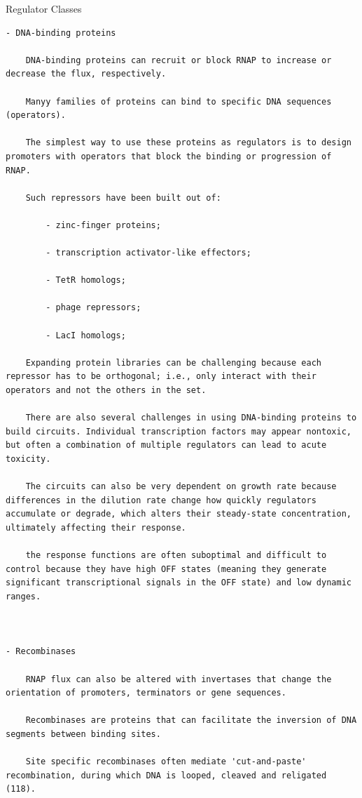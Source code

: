 \documentclass[
]{book}
\begin{document}
Regulator Classes

\begin{verbatim}
- DNA-binding proteins

    DNA-binding proteins can recruit or block RNAP to increase or decrease the flux, respectively.

    Manyy families of proteins can bind to specific DNA sequences (operators).

    The simplest way to use these proteins as regulators is to design promoters with operators that block the binding or progression of RNAP.

    Such repressors have been built out of:

        - zinc-finger proteins;

        - transcription activator-like effectors;

        - TetR homologs;

        - phage repressors;

        - LacI homologs;

    Expanding protein libraries can be challenging because each repressor has to be orthogonal; i.e., only interact with their operators and not the others in the set.

    There are also several challenges in using DNA-binding proteins to build circuits. Individual transcription factors may appear nontoxic, but often a combination of multiple regulators can lead to acute toxicity.

    The circuits can also be very dependent on growth rate because differences in the dilution rate change how quickly regulators accumulate or degrade, which alters their steady-state concentration, ultimately affecting their response.

    the response functions are often suboptimal and difficult to control because they have high OFF states (meaning they generate significant transcriptional signals in the OFF state) and low dynamic ranges.



- Recombinases

    RNAP flux can also be altered with invertases that change the orientation of promoters, terminators or gene sequences.

    Recombinases are proteins that can facilitate the inversion of DNA segments between binding sites.

    Site specific recombinases often mediate 'cut-and-paste' recombination, during which DNA is looped, cleaved and religated (118).


\end{verbatim}
\end{document}
